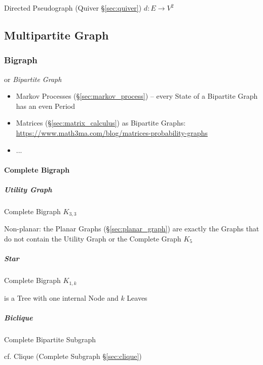 Directed Pseudograph (Quiver \S\ref{sec:quiver}) $d : E \rightarrow
V^2$



\subsection{Multipartite Graph}\label{sec:multipartite_graph}

\subsubsection{Bigraph}\label{sec:bigraph}

or \emph{Bipartite Graph}

\begin{itemize}
  \item Markov Processes (\S\ref{sec:markov_process}) -- every State of a
    Bipartite Graph has an even Period
  \item Matrices (\S\ref{sec:matrix_calculus}) as Bipartite Graphs:
    \url{https://www.math3ma.com/blog/matrices-probability-graphs}
  \item ...
\end{itemize}



\paragraph{Complete Bigraph}\label{sec:complete_bigraph}\hfill

\subparagraph{Utility Graph}\label{sec:utility_graph}\hfill

Complete Bigraph $K_{3,3}$

Non-planar: the Planar Graphs (\S\ref{sec:planar_graph}) are exactly the Graphs
that do not contain the Utility Graph or the Complete Graph $K_5$



\subparagraph{Star}\label{sec:star}\hfill

Complete Bigraph $K_{1,k}$

is a Tree with one internal Node and $k$ Leaves



\subparagraph{Biclique}\label{sec:biclique}\hfill

Complete Bipartite Subgraph

cf. Clique (Complete Subgraph \S\ref{sec:clique})



